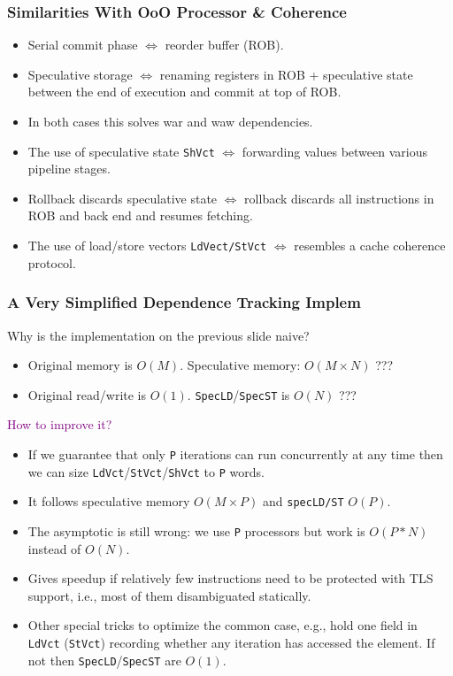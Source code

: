 \documentclass{beamer}
\newcommand{\purple}[1]{\textcolor{Purple}{{#1}}}
\begin{document}
\begin{frame}[fragile,t]
  \frametitle{Similarities With OoO Processor \& Coherence}

\begin{itemize}
\item Serial commit phase $\Leftrightarrow$ reorder buffer (ROB).\medskip
\item Speculative storage $\Leftrightarrow$ renaming registers in ROB +
        speculative state between the end of execution and commit at top of ROB.\medskip
\item In both cases this solves {\sc war} and {\sc waw} dependencies.\medskip
\item The use of speculative state {\tt ShVct} $\Leftrightarrow$ forwarding 
        values between various pipeline stages.\medskip
\item Rollback discards speculative state $\Leftrightarrow$ rollback 
        discards all instructions in ROB and back end and resumes
        fetching.\bigskip

\item The use of load/store vectors {\tt LdVect/StVct} $\Leftrightarrow$
        resembles a cache coherence protocol.
\end{itemize}

\end{frame}

\begin{frame}[fragile,t]
  \frametitle{A Very Simplified Dependence Tracking Implem}

\alert{Why is the implementation on the previous slide naive?}\smallskip\pause

\begin{itemize}
\item Original memory is $O(M)$. Speculative memory: $O(M\times N)$ ???\medskip
\item Original read/write is $O(1)$. {\tt SpecLD}/{\tt SpecST} is $O(N)$ ???
\end{itemize}\bigskip

\purple{How to improve it?}\smallskip\pause
\begin{itemize}
\item If we guarantee that only {\tt P} iterations can run concurrently 
        at any time then we can size {\tt LdVct}/{\tt StVct}/{\tt ShVct} 
        to {\tt P} words.\medskip
\item It follows speculative memory $O(M\times P)$ and {\tt specLD/ST} $O(P)$.\medskip
\item The asymptotic is still wrong: we use {\tt P} processors but work is $O(P*N)$
        instead of $O(N)$.\medskip
\item Gives speedup if relatively few instructions need to be protected
        with TLS support, i.e., most of them disambiguated statically.\medskip
\item Other special tricks to optimize the common case, e.g., hold one field
        in {\tt LdVct} ({\tt StVct}) recording whether any iteration
        has accessed the element. If not then {\tt SpecLD}/{\tt SpecST} are $O(1)$.
\end{itemize} 

\end{frame}
\end{document}
